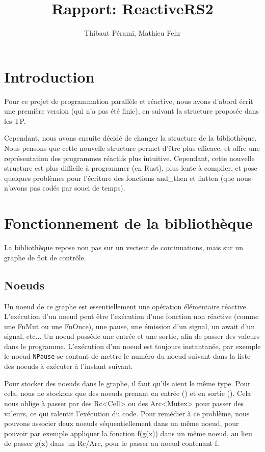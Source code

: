 \documentclass[a4paper]{article}
\title{Rapport: ReactiveRS2}
\author{Thibaut Pérami, Mathieu Fehr}
\renewcommand{\(}{\left(}
\renewcommand{\)}{\right)}
\begin{document}
\maketitle

\section{Introduction}

Pour ce projet de programmation parallèle et réactive, nous avons d'abord écrit
une première version (qui n'a pas été finie), en suivant la structure proposée
dans les TP.

Cependant, nous avons ensuite décidé de changer la structure de la bibliothèque.
Nous pensons que cette nouvelle structure permet d'être plus efficace, et offre
une représentation des programmes réactifs plus intuitive. Cependant, cette
nouvelle structure est plus difficile à programmer (en Rust), plus
lente à compiler, et pose quelques
problèmes pour l'écriture des fonctions and\_then et flatten (que nous n'avons
pas codés par souci de temps).

\section{Fonctionnement de la bibliothèque}

La bibliothèque repose non pas sur un vecteur de continuations, mais sur un
graphe de flot de contrôle. 

\subsection{Noeuds}

Un noeud de ce graphe est essentiellement une opération élémentaire
réactive. L'exécution d'un noeud peut être l'exécution d'une fonction non
réactive (comme une FnMut ou une FnOnce), une pause, une émission d'un signal, un
await d'un signal, etc... Un noeud possède une entrée et une sortie, afin de
passer des valeurs dans le programme. L'exécution d'un noeud est toujours
instantanée, par exemple le noeud \verb!NPause! se contant de mettre le numéro
du noeud suivant dans la liste des noeuds à exécuter à l'instant suivant.

Pour stocker des noeuds dans le graphe, il faut qu'ils aient le même type. Pour
cela, nous ne stockons que des noeuds prenant en entrée () et en sortie ().
Cela nous oblige à passer par des Rc<Cell> ou des Arc<Mutex> pour passer des
valeurs, ce qui ralentit l'exécution du code. Pour remédier à ce problème, nous
pouvons associer deux noeuds séquentiellement dans un même noeud, pour pouvoir
par exemple appliquer la fonction f(g(x)) dans un même noeud, au lieu de passer
g(x) dans un Rc/Arc, pour le passer au noeud contenant f.
\end{document}
